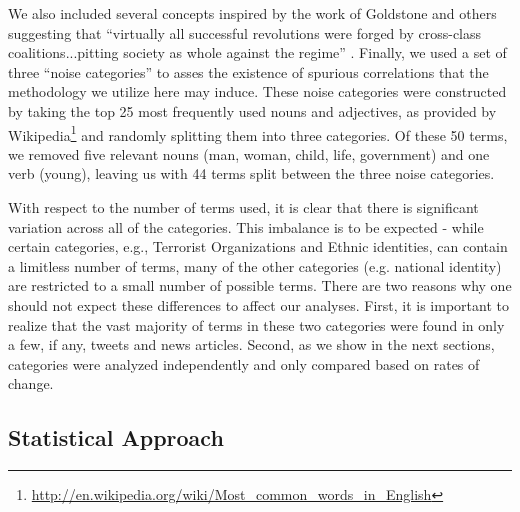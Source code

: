 We also included several concepts inspired by the work of Goldstone and others \citep[e.g.][]{cottle_media_2011} suggesting that ``virtually all successful revolutions were forged by cross-class coalitions...pitting society as whole against the regime'' \citep[][pg. 457]{goldstone_cross-class_2011}. Finally, we used a set of three ``noise categories'' to asses the existence of spurious correlations that the methodology we utilize here may induce.  These noise categories were constructed by taking the top 25 most frequently used nouns and adjectives, as provided by Wikipedia\footnote{\url{http://en.wikipedia.org/wiki/Most_common_words_in_English}} and randomly splitting them into three categories.  Of these 50 terms, we removed five relevant nouns (man, woman, child, life, government) and one verb (young), leaving us with 44 terms split between the three noise categories.

With respect to the number of terms used, it is clear that there is significant variation across all of the categories. This imbalance is to be expected - while certain categories, e.g., Terrorist Organizations and Ethnic identities, can contain a limitless number of terms, many of the other categories (e.g. national identity) are restricted to a small number of possible terms. There are two reasons why one should not expect these differences to affect our analyses. First, it is important to realize that the vast majority of terms in these two categories were found in only a few, if any, tweets and news articles. Second, as we show in the next sections, categories were analyzed independently and only compared based on rates of change.

\subsection{Statistical Approach}

